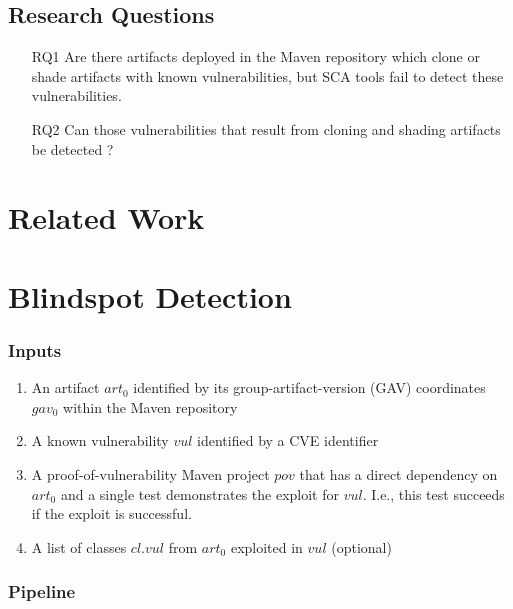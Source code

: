 \documentclass{article}
\begin{document}
\subsection{Research Questions}


\begin{enumerate}
	\item[RQ1]  Are there artifacts deployed in the Maven repository which clone or shade artifacts with known vulnerabilities, but SCA tools fail to detect these vulnerabilities. 
	\item[RQ2] Can those vulnerabilities that result from cloning and shading artifacts be detected ?
\end{enumerate}





\section{Related Work}






\section{Blindspot Detection}


\subsubsection{Inputs}

\begin{enumerate}
	\item An artifact $art_0$ identified by its group-artifact-version (GAV) coordinates $gav_0$ within the Maven repository
	\item A known vulnerability $vul$ identified by a CVE identifier 
	\item A proof-of-vulnerability Maven project $pov$ that has a direct dependency on $art_0$ and a single test demonstrates the exploit for $vul$. I.e., this test succeeds if the exploit is successful.
	\item A list of classes $cl.vul$ from $art_0$ exploited in $vul$  (optional)
\end{enumerate}


\subsubsection{Pipeline}
\end{document}
